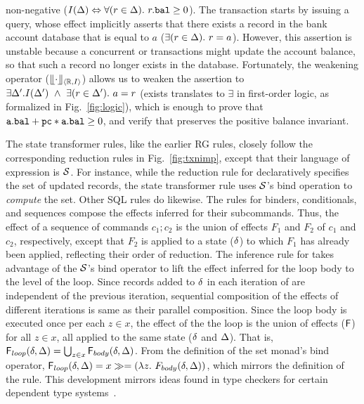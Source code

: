 non-negative ($I(\Delta) \Leftrightarrow \forall(r\in\Delta).~r.{\tt bal}\ge
0$). The transaction starts by issuing a  query, whose
effect implicitly asserts that there exists a record in the bank
account database that is equal to $a$ ($\exists(r\in\Delta).~r=a$).
However, this assertion is unstable because a concurrent 
or  transactions might update the account balance, so that
such a record no longer exists in the database.  Fortunately, the
weakening operator ($\llfloor \cdot \rrfloor_{\langle \mathbb{R},I \rangle}$) allows us to weaken the
assertion to $\exists \Delta'.I(\Delta') ~\wedge~ \exists(r\in\Delta').~a=r$
({\sf exists} translates to $\exists$ in first-order logic, as
formalized in Fig.~\ref{fig:logic}), which is enough to prove that
${\tt a.bal + pc*a.bal}\ge 0$, and verify that 
preserves the positive balance invariant.

The state transformer rules, like the earlier RG rules, closely follow
the corresponding reduction rules in Fig.~\ref{fig:txnimp}, except
that their language of expression is $\mathcal{S}$. For instance, while the
reduction rule for  declaratively specifies the set of
updated records, the state transformer rule uses $\mathcal{S}$'s bind
operation to \emph{compute} the set. Other SQL rules do likewise. The
rules for  binders, conditionals, and sequences compose the
effects inferred for their subcommands. Thus, the effect of a sequence
of commands $c_1;c_2$ is the union of effects $F_1$ and $F_2$ of $c_1$
and $c_2$, respectively, except that $F_2$ is applied to a state
($\delta$) to which $F_1$ has already been applied, reflecting their
order of reduction. The inference rule for  takes advantage
of the $\mathcal{S}$'s bind operator to lift the effect inferred for the loop
body to the level of the loop. Since records added to $\delta$ in each
iteration of  are independent of the previous iteration,
sequential composition of the effects of different iterations is same
as their parallel composition. Since the loop body is executed once
per each $z\in x$, the effect of the the loop is the union of effects
(${\sf F}$) for all $z\in x$, all applied to the same state ($\delta$ and
$\Delta$). That is, ${\sf F}_{loop}(\delta,\Delta) = \bigcup_{z\in
  x}{\sf F}_{body}(\delta,\Delta)$. From the definition of the set monad's bind
operator, ${\sf F}_{loop}(\delta,\Delta) = x \gg= (\lambda
z.~F_{body}(\delta,\Delta))$, which mirrors the definition of the rule.
This development mirrors ideas found in type checkers for certain
dependent type systems~\cite{KJ14}.


